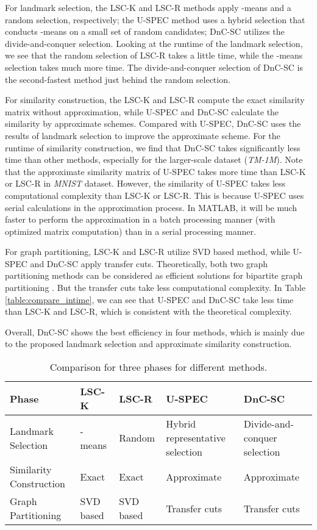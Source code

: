 For landmark selection, the LSC-K and LSC-R methods apply -means and a random selection, respectively; the U-SPEC method uses a hybrid selection that conducts -means on a small set of random candidates;
DnC-SC utilizes the divide-and-conquer selection.
Looking at the runtime of the landmark selection, we see that the random selection of LSC-R takes a little time, while the -means selection takes much more time.
The divide-and-conquer selection of DnC-SC is the second-fastest method just behind the random selection.

For similarity construction, the LSC-K and LSC-R compute the exact similarity matrix without approximation, while U-SPEC and DnC-SC calculate the similarity by approximate schemes.
Compared with U-SPEC, DnC-SC uses the results of landmark selection to improve the approximate scheme.
For the runtime of similarity construction, we find that DnC-SC takes significantly less time than other methods, especially for the larger-scale dataset (\emph{TM-1M}).
Note that the approximate similarity matrix of U-SPEC takes more time than LSC-K or LSC-R in \emph{MNIST} dataset.
However, the similarity of U-SPEC takes less computational complexity than LSC-K or LSC-R.
This is because U-SPEC uses serial calculations in the approximation process.
In MATLAB, it will be much faster to perform the approximation in a batch processing manner (with optimized matrix computation) than in a serial processing manner.

For graph partitioning, LSC-K and LSC-R utilize SVD based method, while U-SPEC and DnC-SC apply transfer cuts.
Theoretically, both two graph partitioning methods can be considered as efficient solutions for bipartite graph partitioning \cite{li2012segmentation,cai2014large}.
But the transfer cuts take less computational complexity.
In Table \ref{table:compare_intime}, we can see that U-SPEC and DnC-SC take less time than LSC-K and LSC-R, which is consistent with the theoretical complexity.

Overall, DnC-SC shows the best efficiency in four methods, which is mainly due to the proposed landmark selection and approximate similarity construction.

\begin{table*}[]
  \centering
  \caption{Comparison for three phases for different methods.}
  \label{table:compare_three_phases}
  \begin{tabular}{@{}l|llll@{}}
    \toprule
    Phase                   & LSC-K     & LSC-R     & U-SPEC                          & DnC-SC                       \\ \midrule
    Landmark Selection      & -means & Random    & Hybrid representative selection & Divide-and-conquer selection \\
    Similarity Construction & Exact     & Exact     & Approximate                     & Approximate                  \\
    Graph Partitioning      & SVD based & SVD based & Transfer cuts                   & Transfer cuts                \\ \bottomrule
  \end{tabular}
\end{table*}

